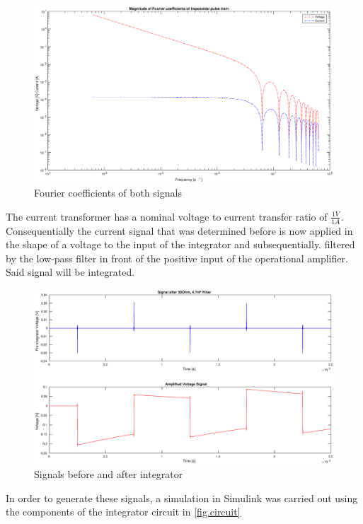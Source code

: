 \begin{figure}[h!tb]
\centerline{\includegraphics[width=\textwidth]{figures/Method/signal_simulation/fourierla.eps}}
\caption{Fourier coefficients of both signals}
\label{fig.fourierla}
\end{figure}

The current transformer has a nominal voltage to current transfer ratio of $\frac{1V}{1A}$. 
Consequentially the current signal that was determined before is now applied in the shape of a voltage to the input of the integrator and subsequentially.
filtered by the low-pass filter in front of the positive input of the operational amplifier. Said signal will be integrated.


\begin{figure}[h!tb]
\centerline{\includegraphics[width=\textwidth]{figures/Method/signal_simulation/integrated.eps}}
\caption{Signals before and after integrator}
\label{fig.integrator}
\end{figure}

In order to generate these signals, a simulation in Simulink was carried out using the components of the integrator circuit in \ref{fig.circuit}


